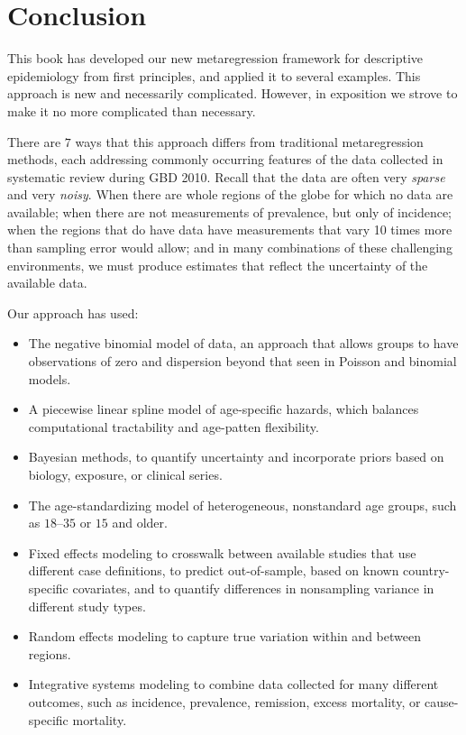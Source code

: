 \chapter{Conclusion}

This book has developed our new metaregression framework for
descriptive epidemiology from first principles, and applied it to
several examples.  This approach is new and necessarily complicated.
However, in exposition we strove to make it no more complicated than
necessary.

There are $7$ ways that this approach differs from traditional
metaregression methods, each addressing commonly occurring features of
the data collected in systematic review during GBD 2010.
Recall that the data are often very \emph{sparse} and very
\emph{noisy}.  When there are whole regions of the globe for which no
data are available; when there are not measurements of prevalence, but
only of incidence; when the regions that do have data have
measurements that vary 10 times more than sampling error would allow;
and in many combinations of these challenging environments, we must
produce estimates that reflect the uncertainty of the available data.

Our approach has used:
\begin{itemize}
\item The negative binomial model of data, an approach that allows groups to have
observations of zero and dispersion beyond that seen in Poisson and binomial models.

\item A piecewise linear spline model of age-specific hazards, which balances computational
tractability and age-patten flexibility.

\item Bayesian methods, to quantify uncertainty and incorporate priors
  based on biology, exposure, or clinical series.

\item The age-standardizing model of heterogeneous, nonstandard age groups, such as $18$--$35$
or $15$ and older.

\item Fixed effects modeling to crosswalk between available studies that use
different case definitions, to predict out-of-sample, based on known
country-specific covariates, and to quantify differences in
nonsampling variance in different study types.

\item Random effects modeling to capture true variation within and between regions.

\item Integrative systems modeling to combine data collected for many different outcomes,
such as incidence, prevalence, remission, excess mortality, or
cause-specific mortality.
\end{itemize}


